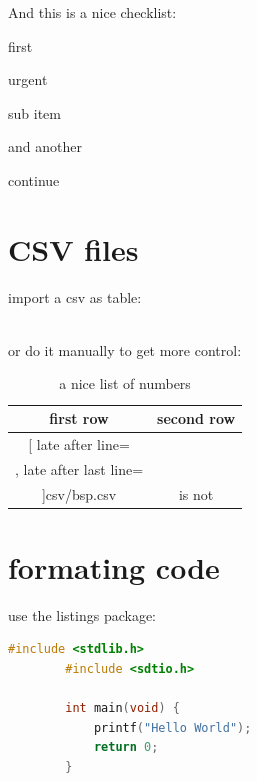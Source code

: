 \documentclass[	%
		fontsize=11pt,  %
		a4paper,	    %
		english,		%
		sans,			%
		f1,				%
	]{HsH-report}		%
\begin{document}
		\pagebreak
		And this is a nice checklist:
		\begin{checklist}
			\item first
			\item urgent
			\begin{checklist}
				\item sub item
				\item and another
			\end{checklist}
			\item continue
		\end{checklist}



	\section{CSV files}
		\label{sec: messwerte}
		import a csv as table:
		\par %
		\\

		or do it manually to get more control:
		\begin{table}
			\caption{a nice list of numbers}
			\begin{tabular}{c|c}
				first row & second row \\\hline\hline
				\csvreader[
					late after line=\\\hline,
					late after last line=\\\hline
				]{csv/bsp.csv}{}{number: $\csvcoli\,\metre$ & is not \csvcoliii}
			\end{tabular}
		\end{table}


\section{formating code} \label{sec: code}
	use the listings package:
	\begin{lstlisting}[language=c,gobble=8]
		#include <stdlib.h>
		#include <sdtio.h>

		int main(void) {
			printf("Hello World");
			return 0;
		}
	\end{lstlisting}



\clearpage
{} %
\recalctypearea
\end{document}

